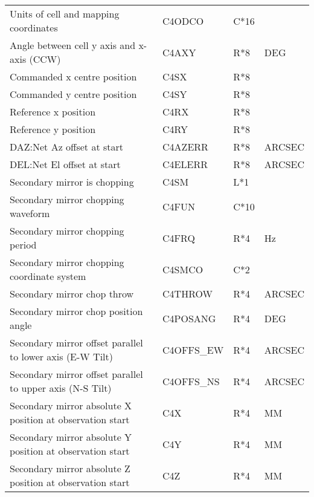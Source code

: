 \begin{tabular}{||l|l|l|l||}
Units of cell and mapping coordinates                          & C4ODCO   & C*16   &  ~    \\      
Angle between cell y axis and x-axis (CCW)                     & C4AXY    & R*8    & DEG   \\      
Commanded x centre position                                    & C4SX     & R*8    &  ~    \\      
Commanded y centre position                                    & C4SY     & R*8    &  ~    \\      
Reference x position                                           & C4RX     & R*8    &  ~    \\      
Reference y position                                           & C4RY     & R*8    &  ~    \\      
DAZ:Net Az offset at start                                     & C4AZERR  & R*8    &ARCSEC \\      
DEL:Net El offset at start                                     & C4ELERR  & R*8    &ARCSEC \\      
Secondary mirror is chopping                                   & C4SM     & L*1    &  ~    \\      
Secondary mirror chopping waveform                             & C4FUN    & C*10   &  ~    \\      
Secondary mirror chopping period                               & C4FRQ    & R*4    & Hz    \\      
Secondary mirror chopping coordinate system                    & C4SMCO   & C*2    &  ~    \\      
Secondary mirror chop throw                                    & C4THROW  & R*4    &ARCSEC \\      
Secondary mirror chop position angle                           & C4POSANG & R*4    & DEG   \\      
Secondary mirror offset parallel to lower axis (E-W Tilt)      & C4OFFS\_EW & R*4   &ARCSEC \\      
Secondary mirror offset parallel to upper axis (N-S Tilt)      & C4OFFS\_NS & R*4   &ARCSEC \\      
Secondary mirror absolute X position at observation start      & C4X      & R*4    & MM    \\      
Secondary mirror absolute Y position at observation start      & C4Y      & R*4    & MM    \\      
Secondary mirror absolute Z position at observation start      & C4Z      & R*4    & MM    \\      

\end{tabular}
